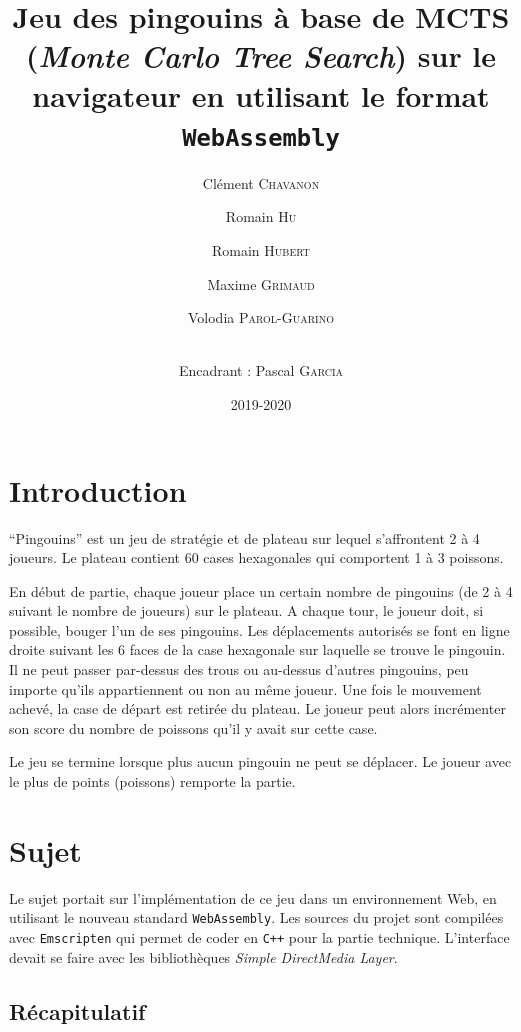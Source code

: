 \documentclass[a4paper,11pt]{article}
\title{\textbf{Jeu des pingouins à base de MCTS (\emph{Monte Carlo Tree Search}) sur le
navigateur en utilisant le format \texttt{WebAssembly}}}
\author{Clément \textsc{Chavanon} \and Romain \textsc{Hu} \and Romain \textsc{Hubert} \and Maxime \textsc{Grimaud} \and Volodia \textsc{Parol-Guarino} \and 
 \\ Encadrant : Pascal \textsc{Garcia}}
\date{2019-2020}
\begin{document}
\maketitle
\begin{abstract}

\end{abstract}

\section*{Introduction}\label{introduction}

``Pingouins'' est un jeu de stratégie et de plateau sur lequel
s'affrontent 2 à 4 joueurs. Le plateau contient 60 cases hexagonales qui
comportent 1 à 3 poissons.

En début de partie, chaque joueur place un certain nombre de pingouins
(de 2 à 4 suivant le nombre de joueurs) sur le plateau. A chaque tour,
le joueur doit, si possible, bouger l'un de ses pingouins. Les
déplacements autorisés se font en ligne droite suivant les 6 faces de la
case hexagonale sur laquelle se trouve le pingouin. Il ne peut passer
par-dessus des trous ou au-dessus d'autres pingouins, peu importe qu'ils
appartiennent ou non au même joueur. Une fois le mouvement achevé, la
case de départ est retirée du plateau. Le joueur peut alors incrémenter
son score du nombre de poissons qu'il y avait sur cette case.

Le jeu se termine lorsque plus aucun pingouin ne peut se déplacer. Le
joueur avec le plus de points (poissons) remporte la partie.

\section{Sujet}\label{sujet}

Le sujet portait sur l'implémentation de ce jeu dans un environnement
Web, en utilisant le nouveau standard \texttt{WebAssembly}. Les sources
du projet sont compilées avec \texttt{Emscripten} qui permet de coder en
\texttt{C++} pour la partie technique. L'interface devait se faire avec
les bibliothèques \emph{Simple DirectMedia Layer}.

\subsection{Récapitulatif}\label{ruxe9capitulatif}
\end{document}
